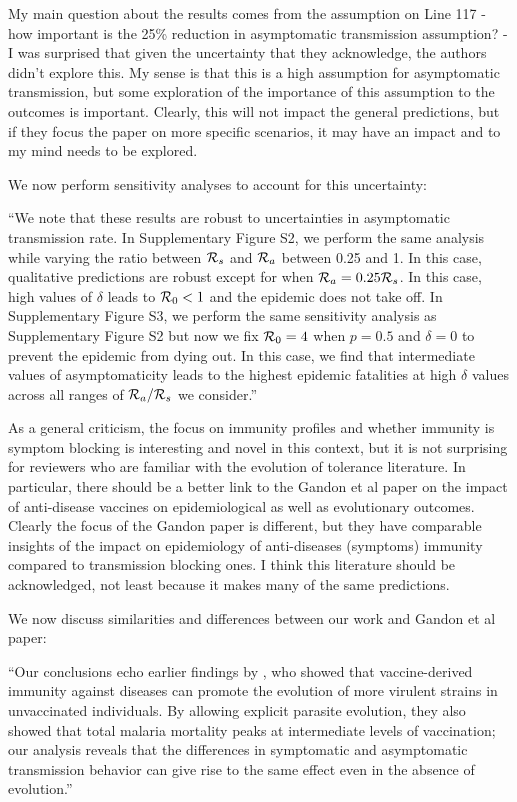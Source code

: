 \documentclass[12pt]{article}
\newcommand{\RR}{\ensuremath{{\cal R}}}
\newcommand{\revtext}{\textsf}
\begin{document}
\revtext{My main question about the results comes from the assumption on Line 117 - how important is the 25\% reduction in asymptomatic transmission assumption? - I was surprised that given the uncertainty that they acknowledge, the authors didn't explore this. My sense is that this is a high assumption for asymptomatic transmission, but some exploration of the importance of this assumption to the outcomes is important. Clearly, this will not impact the general predictions, but if they focus the paper on more specific scenarios, it may have an impact and to my mind needs to be explored.}

We now perform sensitivity analyses to account for this uncertainty:

``We note that these results are robust to uncertainties in asymptomatic transmission rate.
In Supplementary Figure S2, we perform the same analysis while varying the ratio between $\RR_s$ and $\RR_a$ between 0.25 and 1.
In this case, qualitative predictions are robust except for when $\RR_a = 0.25 \RR_s$.
In this case, high values of $\delta$ leads to $\RR_0 < 1$ and the epidemic does not take off.
In Supplementary Figure S3, we perform the same sensitivity analysis as Supplementary Figure S2 but now we fix $\RR_0 = 4$ when $p=0.5$ and $\delta=0$ to prevent the epidemic from dying out.
In this case, we find that intermediate values of asymptomaticity leads to the highest epidemic fatalities at high $\delta$ values across all ranges of $\RR_a/\RR_s$ we consider.''

\revtext{As a general criticism, the focus on immunity profiles and whether immunity is symptom blocking is interesting and novel in this context, but it is not surprising for reviewers who are familiar with the evolution of tolerance literature. In particular, there should be a better link to the Gandon et al paper on the impact of anti-disease vaccines on epidemiological as well as evolutionary outcomes. Clearly the focus of the Gandon paper is different, but they have comparable insights of the impact on epidemiology of anti-diseases (symptoms) immunity compared to transmission blocking ones. I think this literature should be acknowledged, not least because it makes many of the same predictions.}

We now discuss similarities and differences between our work and Gandon et al paper:

``Our conclusions echo earlier findings by \cite{gandon2001imperfect}, who showed that vaccine-derived immunity against diseases can promote the evolution of more virulent strains in unvaccinated individuals.
By allowing explicit parasite evolution, they also showed that total malaria mortality peaks at intermediate levels of vaccination; our analysis reveals that the differences in symptomatic and asymptomatic transmission behavior can give rise to the same effect even in the absence of evolution.''
\end{document}
